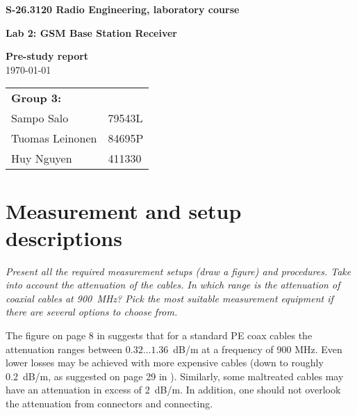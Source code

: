 \documentclass[a4paper, 12pt]{article}
\newlength{\oneLine}
\begin{document}
\begin{titlepage}
\pagestyle{empty}
\begin{center}

\vspace*{30mm}
\noindent\LARGE{\textbf{S-26.3120 Radio Engineering, laboratory course}}

\vspace*{20mm}

\Large{\textbf{Lab 2: GSM Base Station Receiver}}\\

\vspace*{15mm}

\large{\textbf{Pre-study report}}\\
\vspace{15mm}
\large{\today}
	
\vspace*{30mm}
\large{
	\begin{tabular}{l l}
		\textbf{Group 3:} 	& \\
		Sampo Salo			& 79543L	\\
		Tuomas Leinonen 	& 84695P	\\
		Huy Nguyen			& 411330			
	\end{tabular}
}

\end{center}

\end{titlepage}

\section{Measurement and setup descriptions}

\textit{Present all the required measurement setups (draw a figure) 
and procedures. Take into account the attenuation of the cables. In 
which range is the attenuation of coaxial cables at 900~MHz? Pick 
the most suitable measurement equipment if there are several options 
to choose from.}

\vspace*{\oneLine}
\noindent
The figure on page 8 in \cite{hs} suggests that for a standard PE coax 
cables the attenuation ranges between $0.32 \ldots 1.36$~dB/m at a frequency 
of 900 MHz. Even lower losses may be achieved with more expensive cables 
(down to roughly 0.2~dB/m, as suggested on page 29 in \cite{hs}). Similarly, 
some maltreated cables may have an attenuation in excess of 2~dB/m. In 
addition, one should not overlook the attenuation from connectors and 
connecting.
\end{document}
